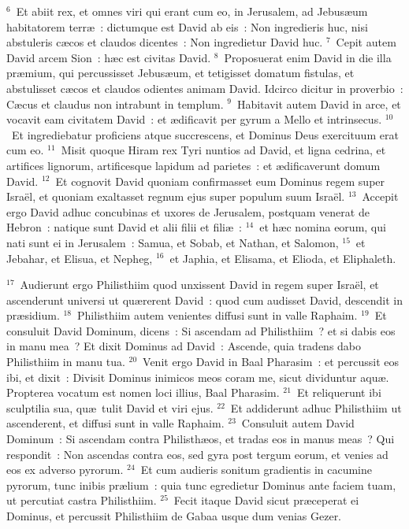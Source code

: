 ${}^{6}$~Et abiit rex, et omnes viri qui erant cum eo, in Jerusalem, ad Jebus\ae um habitatorem terr\ae~: dictumque est David ab eis~: Non ingredieris huc, nisi abstuleris c\ae cos et claudos dicentes~: Non ingredietur David huc.
${}^{7}$~Cepit autem David arcem Sion~: h\ae c est civitas David.
${}^{8}$~Proposuerat enim David in die illa pr\ae mium, qui percussisset Jebus\ae um, et tetigisset domatum fistulas, et abstulisset c\ae cos et claudos odientes animam David. Idcirco dicitur in proverbio~: C\ae cus et claudus non intrabunt in templum.
${}^{9}$~Habitavit autem David in arce, et vocavit eam civitatem David~: et \ae dificavit per gyrum a Mello et intrinsecus.
${}^{10}$~Et ingrediebatur proficiens atque succrescens, et Dominus Deus exercituum erat cum eo.
${}^{11}$~Misit quoque Hiram rex Tyri nuntios ad David, et ligna cedrina, et artifices lignorum, artificesque lapidum ad parietes~: et \ae dificaverunt domum David.
${}^{12}$~Et cognovit David quoniam confirmasset eum Dominus regem super Isra\"el, et quoniam exaltasset regnum ejus super populum suum Isra\"el.
${}^{13}$~Accepit ergo David adhuc concubinas et uxores de Jerusalem, postquam venerat de Hebron~: natique sunt David et alii filii et fili\ae~:
${}^{14}$~et h\ae c nomina eorum, qui nati sunt ei in Jerusalem~: Samua, et Sobab, et Nathan, et Salomon,
${}^{15}$~et Jebahar, et Elisua, et Nepheg,
${}^{16}$~et Japhia, et Elisama, et Elioda, et Eliphaleth.


${}^{17}$~Audierunt ergo Philisthiim quod unxissent David in regem super Isra\"el, et ascenderunt universi ut qu\ae rerent David~: quod cum audisset David, descendit in pr\ae sidium.
${}^{18}$~Philisthiim autem venientes diffusi sunt in valle Raphaim.
${}^{19}$~Et consuluit David Dominum, dicens~: Si ascendam ad Philisthiim~? et si dabis eos in manu mea~? Et dixit Dominus ad David~: Ascende, quia tradens dabo Philisthiim in manu tua.
${}^{20}$~Venit ergo David in Baal Pharasim~: et percussit eos ibi, et dixit~: Divisit Dominus inimicos meos coram me, sicut dividuntur aqu\ae . Propterea vocatum est nomen loci illius, Baal Pharasim.
${}^{21}$~Et reliquerunt ibi sculptilia sua, qu\ae\ tulit David et viri ejus.
${}^{22}$~Et addiderunt adhuc Philisthiim ut ascenderent, et diffusi sunt in valle Raphaim.
${}^{23}$~Consuluit autem David Dominum~: Si ascendam contra Philisth\ae os, et tradas eos in manus meas~? Qui respondit~: Non ascendas contra eos, sed gyra post tergum eorum, et venies ad eos ex adverso pyrorum.
${}^{24}$~Et cum audieris sonitum gradientis in cacumine pyrorum, tunc inibis pr\ae lium~: quia tunc egredietur Dominus ante faciem tuam, ut percutiat castra Philisthiim.
${}^{25}$~Fecit itaque David sicut pr\ae ceperat ei Dominus, et percussit Philisthiim de Gabaa usque dum venias Gezer.

